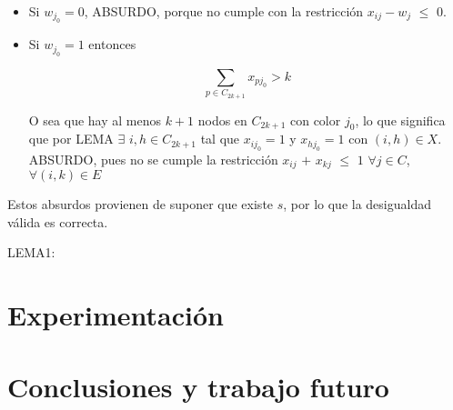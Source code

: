 \documentclass[a4paper]{article}
\begin{document}
\begin{itemize}

	\item Si $w_{j_0} = 0$, ABSURDO, porque no cumple con la restricción $x_{ij} - w_j$ $\leq$ $0$.
	
	\item Si $w_{j_0} = 1$ entonces
	
	\begin{equation*}
	\sum_{p \in C_{2k+1}} x_{pj_0} > k
	\end{equation*}

	O sea que hay al menos $k+1$ nodos en $C_{2k+1}$ con color $j_0$, lo que significa que por LEMA $\exists$ $i,h \in C_{2k+1}$ tal que $x_{ij_0} =1$ y $x_{hj_0} =1$ con $(i,h) \in X$.
	ABSURDO, pues no se cumple la restricción $x_{ij}$ $+$ $x_{kj}$ $\leq$ $1$   $\forall j \in C$, $\forall (i,k) \in E$
\end{itemize}

Estos absurdos provienen de suponer que existe $s$, por lo que la desigualdad válida es correcta.

LEMA1:




\newpage

\section{Experimentación}

\newpage

\section{Conclusiones y trabajo futuro} 
\end{document}
